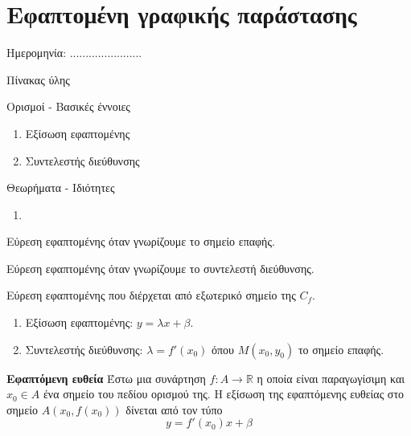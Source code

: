\documentclass[twoside,nofonts,internet,math,spyros]{frontisthrio}
\newcommand{\myitem}{\stepcounter{enumi}\item[\raisebox{0.5mm}{\faExclamationTriangle}\ \Large$\square$]}
\begin{document}
\section{Εφαπτομένη γραφικής παράστασης}
\begin{flushright}
\faCalendar* Ημερομηνία: .......................
\end{flushright}
\begin{mybox}[mysubtitle]{Πίνακας ύλης}
\begin{tcbraster}[raster columns=2,raster equal height]
\begin{myleftbox}{Ορισμοί - Βασικές έννοιες\ \ \faBook}
\begin{enumerate}[itemsep=0mm]
\item Εξίσωση εφαπτομένης
\item Συντελεστής διεύθυνσης
\end{enumerate}
\end{myleftbox}
\begin{myrightbox}{Θεωρήματα - Ιδιότητες\ \ \faTools}
\begin{enumerate}[itemsep=0mm]
\item 
\end{enumerate}
\end{myrightbox}
\end{tcbraster}
\begin{multicols}{2}
\begin{todolist}[itemsep=0mm]
\myitem Εύρεση εφαπτομένης όταν γνωρίζουμε το σημείο επαφής.
\item Εύρεση εφαπτομένης όταν γνωρίζουμε το συντελεστή διεύθυνσης.
\item Εύρεση εφαπτομένης που διέρχεται από εξωτερικό σημείο της $ C_f $.
\end{todolist}
\end{multicols}
\begin{multicols}{2}
\begin{enumerate}[itemsep=0mm]
\item Εξίσωση εφαπτομένης: $ y=\lambda x+\beta $.
\item Συντελεστής διεύθυνσης: $ \lambda=f'(x_0) $ όπου $ M(x_0,y_0) $ το σημείο επαφής.
\end{enumerate}
\end{multicols}
\end{mybox}
\newpage
\thewrhmata
 
\begin{arithmisi}
\item\textbf{Εφαπτόμενη ευθεία}
Έστω μια συνάρτηση $ f:A\to\mathbb{R} $ η οποία είναι παραγωγίσιμη και $ x_0\in A $ ένα σημείο του πεδίου ορισμού της. Η εξίσωση της εφαπτόμενης ευθείας στο σημείο $ A(x_0,f(x_0)) $ δίνεται από τον τύπο
\[ y=f'(x_0)x+\beta \]
\end{arithmisi}
\newpage
\end{document}
